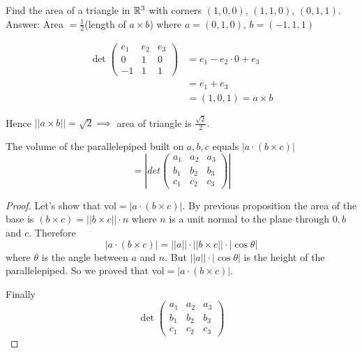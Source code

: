 \documentclass[10pt]{scrartcl}
\begin{document}
\begin{example}
Find the area of a triangle in $\mathbb{R}^3$ with corners $(1,0,0),\,(1,1,0),\,(0,1,1)$.\\

Answer: Area $= \frac{1}{2}$(length of $a \times b$) where $a = (0,1,0),\, b = (-1,1,1)$

\begin{center}
\end{center}
	
\begin{align*}
  \det\begin{pmatrix}
e_1 & e_2 & e_3 \\ 0 & 1 & 0 \\ -1 & 1 & 1	
\end{pmatrix}
&= e_1 -e_2 \cdot 0 + e_3\\
&= e_1 + e_3\\
&= (1,0,1) = a \times b
\end{align*}

Hence $||a\times b|| = \sqrt{2} \implies$ area of triangle is $\frac{\sqrt{2}}{2}$.
\end{example}\vsp 


\begin{proposition}
The volume of the parallelepiped built on $a,b,c$ equals $|a\cdot (b\times c)|$
\[
  = \left|det\begin{pmatrix}
 	a_1& a_2 & a_3\\ b_1 & b_2 & b_3\\ c_1 & c_2 & c_3
 \end{pmatrix}\right|
\]

\end{proposition}
\begin{proof}
Let's show that vol$ = |a\cdot (b \times c)|$. By previous proposition the area of the base is $(b\times c) = ||b \times c||\cdot n$ where $n$ is a unit normal to the plane through $0, b$ and $c$. Therefore
\[
  |a\cdot (b \times c)| = ||a|| \cdot || b\times c|| \cdot |\cos\theta|
\]
where $\theta$ is the angle between $a$ and $n$. But $||a||\cdot|\cos\theta|$ is the height of the parallelepiped. So we proved that vol$ = |a\cdot (b \times c)|$. 

Finally 
\[
  \det\begin{pmatrix}
	a_1&a_2 & a_3 \\ b_1 & b_2 & b_3\\ c_1 & c_2 & c_3
\end{pmatrix}
\]


	
\end{proof}
\end{document}
